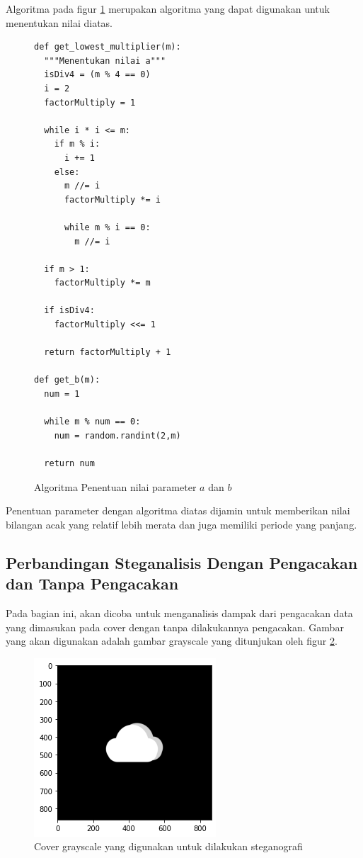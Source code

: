 \documentclass[10pt,conference]{IEEEtran}
\theoremstyle{definition}
\begin{document}
Algoritma pada figur \ref{algo:parameter} merupakan algoritma yang dapat digunakan untuk menentukan nilai diatas.

\begin{figure}
    \begin{verbatim}
def get_lowest_multiplier(m):
  """Menentukan nilai a"""
  isDiv4 = (m % 4 == 0)
  i = 2
  factorMultiply = 1

  while i * i <= m:
    if m % i:
      i += 1
    else:
      m //= i
      factorMultiply *= i

      while m % i == 0:
        m //= i
  
  if m > 1:
    factorMultiply *= m
  
  if isDiv4:
    factorMultiply <<= 1
  
  return factorMultiply + 1

def get_b(m):
  num = 1

  while m % num == 0:
    num = random.randint(2,m)
  
  return num
    \end{verbatim}
    \caption{Algoritma Penentuan nilai parameter $a$ dan $b$}
    \label{algo:parameter} 
\end{figure}

Penentuan parameter dengan algoritma diatas dijamin untuk memberikan nilai bilangan acak yang relatif lebih merata dan juga memiliki periode yang panjang.

\subsection{Perbandingan Steganalisis Dengan Pengacakan dan Tanpa Pengacakan}
Pada bagian ini, akan dicoba untuk menganalisis dampak dari pengacakan data yang dimasukan pada cover dengan tanpa dilakukannya pengacakan.
Gambar yang akan digunakan adalah gambar grayscale yang ditunjukan oleh figur \ref{fig:cloudbw}.

\begin{figure}
    \centerline{\includegraphics[width=0.5\columnwidth]{cloud-original-gs.png}}
    \caption{Cover grayscale yang digunakan untuk dilakukan steganografi}
    \label{fig:cloudbw} 
\end{figure}
\end{document}
